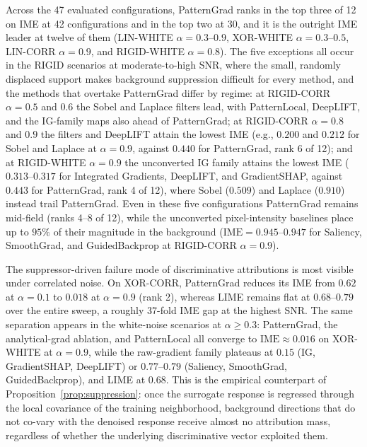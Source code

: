 \documentclass[pdflatex,sn-mathphys-num]{sn-jnl}
\theoremstyle{thmstyleone}
\theoremstyle{thmstyletwo}%
\theoremstyle{thmstylethree}%
\begin{document}
Across the 47 evaluated configurations, PatternGrad ranks in the top three of 12 on IME at 42 configurations and in the top two at 30, and it is the outright IME leader at twelve of them (LIN-WHITE $\alpha = 0.3$--$0.9$, XOR-WHITE $\alpha = 0.3$--$0.5$, LIN-CORR $\alpha = 0.9$, and RIGID-WHITE $\alpha = 0.8$). The five exceptions all occur in the RIGID scenarios at moderate-to-high SNR, where the small, randomly displaced support makes background suppression difficult for every method, and the methods that overtake PatternGrad differ by regime: at RIGID-CORR $\alpha = 0.5$ and $0.6$ the Sobel and Laplace filters lead, with PatternLocal, DeepLIFT, and the IG-family maps also ahead of PatternGrad; at RIGID-CORR $\alpha = 0.8$ and $0.9$ the filters and DeepLIFT attain the lowest IME (e.g., $0.200$ and $0.212$ for Sobel and Laplace at $\alpha = 0.9$, against $0.440$ for PatternGrad, rank 6 of 12); and at RIGID-WHITE $\alpha = 0.9$ the unconverted IG family attains the lowest IME ($0.313$--$0.317$ for Integrated Gradients, DeepLIFT, and GradientSHAP, against $0.443$ for PatternGrad, rank 4 of 12), where Sobel ($0.509$) and Laplace ($0.910$) instead trail PatternGrad. Even in these five configurations PatternGrad remains mid-field (ranks 4--8 of 12), while the unconverted pixel-intensity baselines place up to $95\%$ of their magnitude in the background ($\mathrm{IME} = 0.945$--$0.947$ for Saliency, SmoothGrad, and GuidedBackprop at RIGID-CORR $\alpha = 0.9$).

The suppressor-driven failure mode of discriminative attributions is most visible under correlated noise. On XOR-CORR, PatternGrad reduces its IME from $0.62$ at $\alpha = 0.1$ to $0.018$ at $\alpha = 0.9$ (rank 2), whereas LIME remains flat at $0.68$--$0.79$ over the entire sweep, a roughly 37-fold IME gap at the highest SNR. The same separation appears in the white-noise scenarios at $\alpha \ge 0.3$: PatternGrad, the analytical-grad ablation, and PatternLocal all converge to $\mathrm{IME} \approx 0.016$ on XOR-WHITE at $\alpha = 0.9$, while the raw-gradient family plateaus at $0.15$ (IG, GradientSHAP, DeepLIFT) or $0.77$--$0.79$ (Saliency, SmoothGrad, GuidedBackprop), and LIME at $0.68$. This is the empirical counterpart of Proposition~\ref{prop:suppression}: once the surrogate response is regressed through the local covariance of the training neighborhood, background directions that do not co-vary with the denoised response receive almost no attribution mass, regardless of whether the underlying discriminative vector exploited them.
\end{document}
